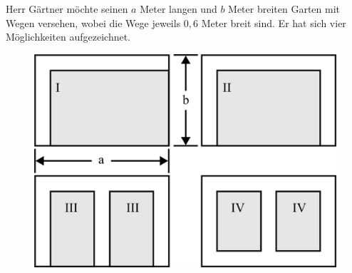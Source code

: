 \documentclass[a4paper,12pt]{article}
\begin{document}
\begin{minipage}[t]{0.55\textwidth}
  Herr Gärtner möchte seinen $a$ Meter langen und $b$ Meter breiten Garten mit Wegen versehen, wobei die Wege jeweils $0,6$ Meter breit sind. Er hat sich vier Möglichkeiten aufgezeichnet. 
\end{minipage}
\hspace*{0.75cm}
\begin{minipage}[t]{0.40\textwidth}
  \begin{figure}[H]
    \vspace{-1cm}
    \centering
    \includegraphics[width=1\linewidth]{7G_2SA_image2.png}
  \end{figure}
\end{minipage}
\end{document}
